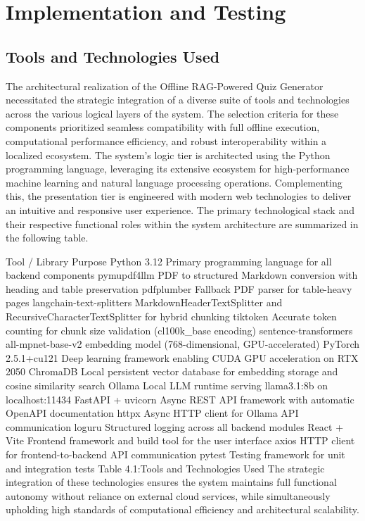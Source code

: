 \documentclass[12pt,a4paper]{report}
\begin{document}
\chapter{Implementation and Testing}
\section{Tools and Technologies Used}
The architectural realization of the Offline RAG-Powered Quiz Generator necessitated the strategic integration of a diverse suite of tools and technologies across the various logical layers of the system. The selection criteria for these components prioritized seamless compatibility with full offline execution, computational performance efficiency, and robust interoperability within a localized ecosystem.
The system's logic tier is architected using the Python programming language, leveraging its extensive ecosystem for high-performance machine learning and natural language processing operations. Complementing this, the presentation tier is engineered with modern web technologies to deliver an intuitive and responsive user experience.
The primary technological stack and their respective functional roles within the system architecture are summarized in the following table.




Tool / Library
Purpose
Python 3.12
Primary programming language for all backend components
pymupdf4llm
PDF to structured Markdown conversion with heading and table preservation
pdfplumber
Fallback PDF parser for table-heavy pages
langchain-text-splitters
MarkdownHeaderTextSplitter and RecursiveCharacterTextSplitter for hybrid chunking
tiktoken
Accurate token counting for chunk size validation (cl100k\_base encoding)
sentence-transformers
all-mpnet-base-v2 embedding model (768-dimensional, GPU-accelerated)
PyTorch 2.5.1+cu121
Deep learning framework enabling CUDA GPU acceleration on RTX 2050
ChromaDB
Local persistent vector database for embedding storage and cosine similarity search
Ollama
Local LLM runtime serving llama3.1:8b on localhost:11434
FastAPI + uvicorn
Async REST API framework with automatic OpenAPI documentation
httpx
Async HTTP client for Ollama API communication
loguru
Structured logging across all backend modules
React + Vite
Frontend framework and build tool for the user interface
axios
HTTP client for frontend-to-backend API communication
pytest
Testing framework for unit and integration tests
Table 4.1:Tools and Technologies Used
The strategic integration of these technologies ensures the system maintains full functional autonomy without reliance on external cloud services, while simultaneously upholding high standards of computational efficiency and architectural scalability.
\end{document}
